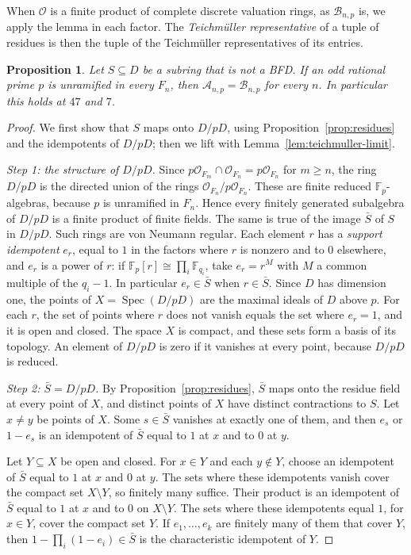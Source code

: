 \documentclass[11pt]{article}
\theoremstyle{plain}
\newtheorem{proposition}[theorem]{Proposition}
\theoremstyle{definition}
\theoremstyle{remark}
\DeclareMathOperator{\Spec}{Spec}
\newcommand{\F}{\mathbb F}
\newcommand{\OO}{\mathcal O}
\begin{document}
When $\OO$ is a finite product of complete discrete valuation rings, as
$\mathcal B_{n,p}$ is, we apply the lemma in each factor.  The
\emph{Teichm\"uller representative} of a tuple of residues is then the
tuple of the Teichm\"uller representatives of its entries.

\begin{proposition}\label{prop:unramified}
Let $S\subseteq D$ be a subring that is not a BFD.  If an odd rational
prime $p$ is unramified in every $F_n$, then
$\mathcal A_{n,p}=\mathcal B_{n,p}$ for every $n$.  In particular this
holds at $47$ and $7$.
\end{proposition}
\begin{proof}
We first show that $S$ maps onto $D/pD$, using
Proposition~\ref{prop:residues} and the idempotents of $D/pD$; then we
lift with Lemma~\ref{lem:teichmuller-limit}.

\emph{Step 1: the structure of $D/pD$.}  Since $p\OO_{F_m}\cap
\OO_{F_n}=p\OO_{F_n}$ for $m\geq n$, the ring $D/pD$ is the directed
union of the rings $\OO_{F_n}/p\OO_{F_n}$.  These are finite reduced
$\F_p$-algebras, because $p$ is unramified in $F_n$.  Hence every finitely
generated subalgebra of $D/pD$ is a finite product of finite fields.  The
same is true of the image $\bar S$ of $S$ in $D/pD$.  Such rings are von
Neumann regular.  Each element $r$ has a \emph{support idempotent}
$e_r$, equal to $1$ in the factors where $r$ is nonzero and to $0$
elsewhere, and $e_r$ is a power of $r$: if $\F_p[r]\cong\prod_i\F_{q_i}$,
take $e_r=r^{M}$ with $M$ a common multiple of the $q_i-1$.  In
particular $e_r\in\bar S$ when $r\in\bar S$.  Since $D$ has dimension one, the
points of $X=\Spec(D/pD)$ are the maximal ideals of $D$ above $p$.  For each $r$,
the set of points where $r$ does not vanish equals the set where $e_r=1$,
and it is open and closed.  The space $X$ is compact, and these sets form
a basis of its topology.  An element of $D/pD$ is zero if it vanishes at
every point, because $D/pD$ is reduced.

\emph{Step 2: $\bar S=D/pD$.}  By Proposition~\ref{prop:residues}, $\bar S$
maps onto the residue field at every point of $X$, and distinct points of
$X$ have distinct contractions to $S$.  Let $x\neq y$ be points of $X$.
Some $s\in\bar S$ vanishes at exactly one of them, and then $e_s$ or
$1-e_s$ is an idempotent of $\bar S$ equal to $1$ at $x$ and to $0$ at
$y$.

Let $Y\subseteq X$ be open and closed.  For $x\in Y$ and each $y\notin
Y$, choose an idempotent of $\bar S$ equal to $1$ at $x$ and $0$ at $y$.
The sets where these idempotents vanish cover the compact set
$X\setminus Y$, so finitely many suffice.  Their product is an
idempotent of $\bar S$ equal to $1$ at $x$ and to $0$ on $X\setminus Y$.
The sets where these idempotents equal $1$, for $x\in Y$, cover the
compact set $Y$.  If $e_1,\dots,e_k$ are finitely many of them that
cover $Y$, then $1-\prod_i(1-e_i)\in\bar S$ is the characteristic
idempotent of $Y$.


\end{proof}
\end{document}
